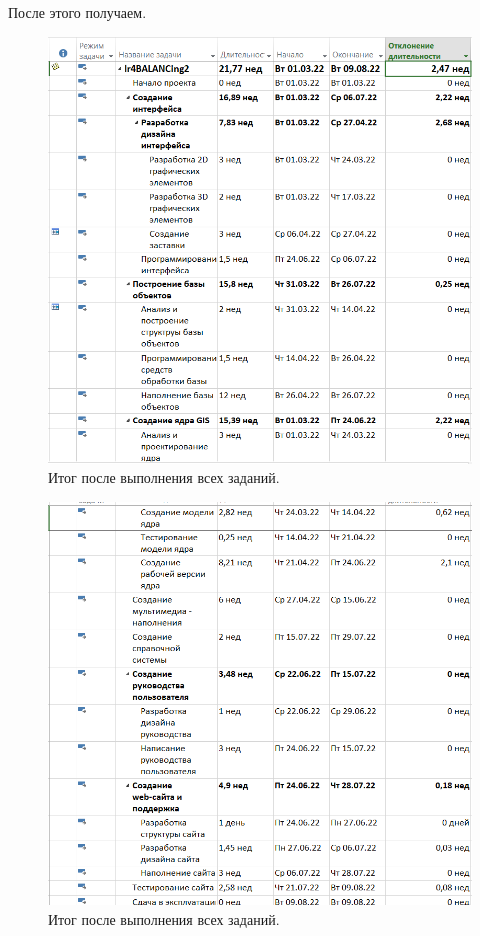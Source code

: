 \documentclass[a4paper,14pt]{extreport} %
\begin{document}
\begin{enumerate}
После этого получаем.

\begin{figure}[H]
  \centering
  \caption{Итог после выполнения всех заданий. }
  \includegraphics[scale=0.8]{result1}
\end{figure}

\begin{figure}[H]
	\centering
	\caption{Итог после выполнения всех заданий. }
	\includegraphics[scale=0.8]{result2}
\end{figure}


\end{enumerate}
\end{document}

